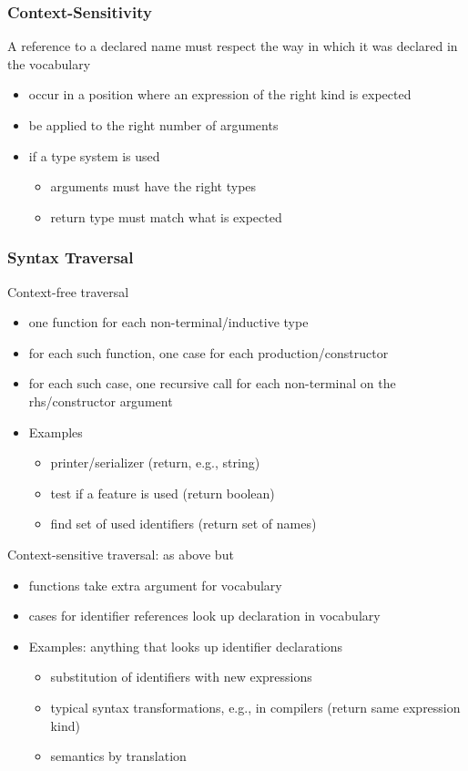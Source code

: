 \begin{frame}\frametitle{Context-Sensitivity}
A reference to a declared name must respect the way in which it was declared in the vocabulary
\begin{itemize}
 \item occur in a position where an expression of the right kind is expected
 \item be applied to the right number of arguments
 \item if a type system is used
  \begin{itemize}
  \item arguments must have the right types
  \item return type must match what is expected
  \end{itemize}
\end{itemize}
\end{frame}

\begin{frame}\frametitle{Syntax Traversal}
Context-free traversal  
\begin{itemize}
\item one function for each non-terminal/inductive type
\item for each such function, one case for each production/constructor
\item for each such case, one recursive call for each non-terminal on the rhs/constructor argument
\item Examples
 \begin{itemize}
 \item printer/serializer (return, e.g., string)
 \item test if a feature is used (return boolean)
 \item find set of used identifiers (return set of names)
 \end{itemize}
\end{itemize}

Context-sensitive traversal: as above but
\begin{itemize}
\item functions take extra argument for vocabulary
\item cases for identifier references look up declaration in vocabulary
\item Examples: anything that looks up identifier declarations
 \begin{itemize}
 \item substitution of identifiers with new expressions
 \item typical syntax transformations, e.g., in compilers
  (return same expression kind)
 \item semantics by translation
 \end{itemize}
\end{itemize}
\end{frame}

